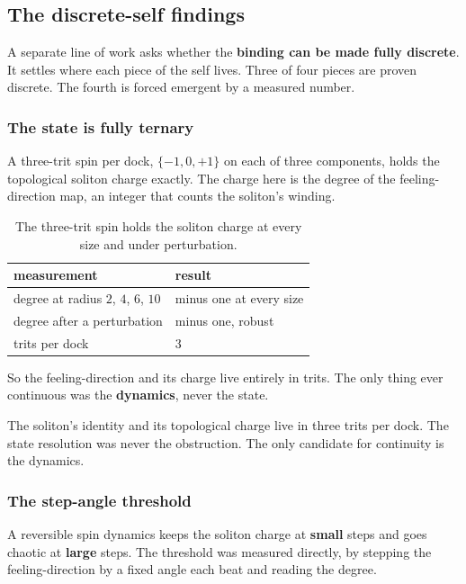 \subsection{The discrete-self findings}

A separate line of work asks whether the \textbf{binding can be made fully discrete}. It settles where each piece of the self lives. Three of four pieces are proven discrete. The fourth is forced emergent by a measured number.

\subsubsection{The state is fully ternary}

A three-trit spin per dock, $\{-1, 0, +1\}$ on each of three components, holds the topological soliton charge exactly. The charge here is the degree of the feeling-direction map, an integer that counts the soliton's winding.

\begin{table}[ht]
\centering
\begin{tabular}{@{}ll@{}}
\toprule
measurement & result \\
\midrule
degree at radius $2$, $4$, $6$, $10$ & minus one at every size \\
degree after a perturbation & minus one, robust \\
trits per dock & $3$ \\
\bottomrule
\end{tabular}
\caption{The three-trit spin holds the soliton charge at every size and under perturbation.}
\label{tab:ternary}
\end{table}

So the feeling-direction and its charge live entirely in trits. The only thing ever continuous was the \textbf{dynamics}, never the state.

\begin{result}
The soliton's identity and its topological charge live in three trits per dock. The state resolution was never the obstruction. The only candidate for continuity is the dynamics.
\end{result}

\subsubsection{The step-angle threshold}

A reversible spin dynamics keeps the soliton charge at \textbf{small} steps and goes chaotic at \textbf{large} steps. The threshold was measured directly, by stepping the feeling-direction by a fixed angle each beat and reading the degree.

